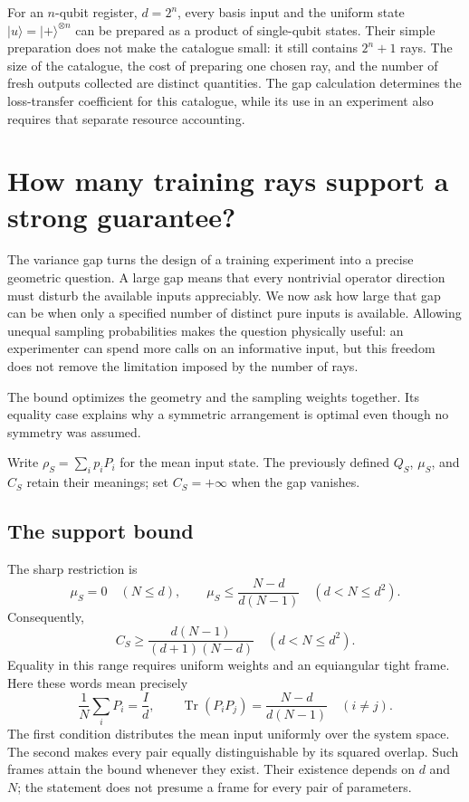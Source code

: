 \documentclass[11pt,a4paper]{article}
\newcommand{\ket}[1]{\lvert #1\rangle}
\newcommand{\Tr}{\operatorname{Tr}}
\numberwithin{equation}{section}
\begin{document}
For an $n$-qubit register, $d=2^n$, every basis input and the uniform state $\ket{u}=\ket{+}^{\otimes n}$ can be prepared as a product of single-qubit states. Their simple preparation does not make the catalogue small: it still contains $2^n+1$ rays. The size of the catalogue, the cost of preparing one chosen ray, and the number of fresh outputs collected are distinct quantities. The gap calculation determines the loss-transfer coefficient for this catalogue, while its use in an experiment also requires that separate resource accounting.

\section{How many training rays support a strong guarantee?}
\label{dc:design}

The variance gap turns the design of a training experiment into a precise
geometric question.  A large gap means that every nontrivial operator direction
must disturb the available inputs appreciably.  We now ask how large that gap
can be when only a specified number of distinct pure inputs is available.
Allowing unequal sampling probabilities makes the question physically useful:
an experimenter can spend more calls on an informative input, but this freedom
does not remove the limitation imposed by the number of rays.

The bound optimizes the geometry and the sampling weights together. Its equality case explains why a symmetric arrangement is optimal even though no symmetry was assumed.

Write $\rho_S=\sum_i p_iP_i$ for the mean input state. The previously defined $Q_S$, $\mu_S$, and $C_S$ retain their meanings; set $C_S=+\infty$ when the gap vanishes.

\subsection{The support bound}

The sharp restriction is
\begin{equation}
 \mu_S=0\quad(N\leq d),\qquad
 \mu_S\leq\frac{N-d}{d(N-1)}
 \quad(d<N\leq d^2).
 \label{dc:support}
\end{equation}
Consequently,
\begin{equation}
 C_S\geq\frac{d(N-1)}{(d+1)(N-d)}
 \quad(d<N\leq d^2).
 \label{dc:support-coefficient}
\end{equation}
Equality in this range requires uniform weights and an equiangular tight
frame.  Here these words mean precisely
\begin{equation}
 \frac1N\sum_iP_i=\frac Id,
 \qquad
 \Tr(P_iP_j)=\frac{N-d}{d(N-1)}\quad(i\ne j).
 \label{dc:etf}
\end{equation}
The first condition distributes the mean input uniformly over the system
space.  The second makes every pair equally distinguishable by its squared
overlap.  Such frames attain the bound whenever they exist.  Their existence
depends on $d$ and $N$; the statement does not presume a frame for every pair
of parameters.
\end{document}
